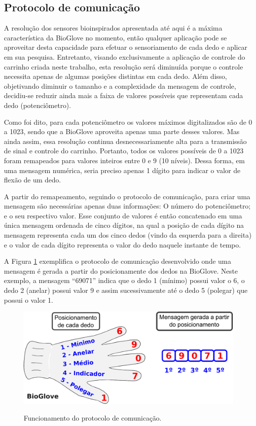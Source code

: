 \documentclass[
	12pt,				%
	openright,			%
	oneside,			%
	a4paper,			%
	english,			%
	brazil				%
	]{abntex2}
\begin{document}
			\subsection{Protocolo de comunicação}


		A resolução dos sensores bioinspirados apresentada até aqui é a máxima característica da BioGlove no momento, então qualquer aplicação pode se aproveitar desta capacidade para efetuar o sensoriamento de cada dedo e aplicar em sua pesquisa. Entretanto, visando exclusivamente a aplicação de controle do carrinho criada neste trabalho, esta resolução será diminuída porque o controle necessita apenas de algumas posições distintas em cada dedo. Além disso, objetivando diminuir o tamanho e a complexidade da mensagem de controle, decidiu-se reduzir ainda mais a faixa de valores possíveis que representam cada dedo (potenciômetro). 
		
		Como foi dito, para cada potenciômetro os valores máximos digitalizados são de 0 a 1023, sendo que a BioGlove aproveita apenas uma parte desses valores. Mas ainda assim, essa resolução continua desnecessariamente alta para a transmissão de sinal e controle do carrinho. Portanto, todos os valores possíveis de 0 a 1023 foram remapeados para valores inteiros entre 0 e 9 (10 níveis). Dessa forma, em uma mensagem numérica, seria preciso apenas 1 dígito para indicar o valor de flexão de um dedo. 
		
		A partir do remapeamento, seguindo o protocolo de comunicação, para criar uma mensagem são necessárias apenas duas informações: O número do potenciômetro; e o seu respectivo valor. Esse conjunto de valores é então concatenado em uma única mensagem ordenada de cinco dígitos, na qual a posição de cada dígito na mensagem representa cada um dos cinco dedos (vindo da esquerda para a direita) e o valor de cada dígito representa o valor do dedo naquele instante de tempo.  
		
		A Figura \ref{Fig:glove-create-msg1} exemplifica o protocolo de comunicação desenvolvido onde uma mensagem é gerada a partir do posicionamente dos dedos na BioGlove. Neste exemplo, a mensagem ``69071'' indica que o dedo 1 (mínimo) possui valor o 6, o dedo 2 (anelar) possui valor 9 e assim sucessivamente até o dedo 5 (polegar) que possui o valor 1.


		\begin{figure}[h!]
			\centering
			\caption{Funcionamento do protocolo de comunicação.}
  		\includegraphics[width=12cm]{./figures/glove-create-msg1.png}
  		\label{Fig:glove-create-msg1}
		\end{figure}
		
\end{document}
